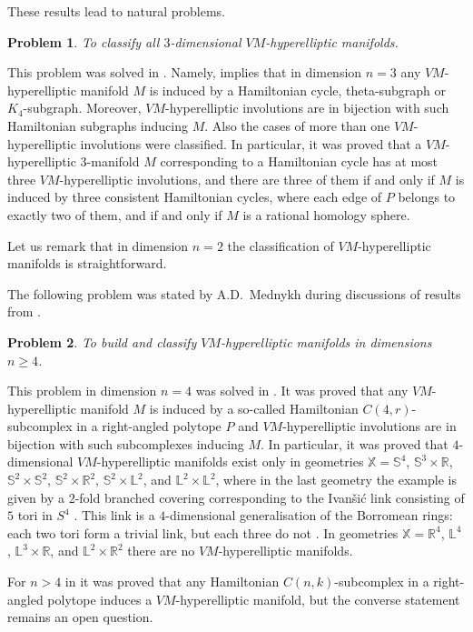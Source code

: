 \documentclass[12pt]{amsart}
\newtheorem{problem}{Problem}
\theoremstyle{definition}
\theoremstyle{remark}
\begin{document}
These results lead to natural problems.
\begin{problem}
To classify all $3$-dimensional $VM$-hyperelliptic manifolds.
\end{problem}
This problem was solved in \cite{E24}. Namely, \cite[Theorem 11.5]{E24} implies that in dimension $n=3$ any $VM$-hyperelliptic manifold $M$ is induced by a Hamiltonian cycle, theta-subgraph or $K_4$-subgraph. Moreover,
$VM$-hyperelliptic involutions are in bijection with such Hamiltonian subgraphs 
inducing $M$. Also the cases of more than one $VM$-hyperelliptic involutions were classified. In particular,
it was proved that a $VM$-hyperelliptic $3$-manifold $M$ corresponding to a Hamiltonian cycle has at most three 
$VM$-hyperelliptic involutions, and there are three of them if and only if $M$ is induced by three consistent Hamiltonian cycles,
where each edge of $P$ belongs to exactly two of them, and if and only if $M$ is a rational homology sphere.

Let us remark that in dimension $n=2$ the classification of $VM$-hyperelliptic manifolds is straightforward.

The following problem was stated by A.D.~Mednykh during discussions of results from \cite{E24}.
\begin{problem}
To build and classify $VM$-hyperelliptic manifolds in dimensions $n\geqslant 4$.
\end{problem}
This problem in dimension $n=4$ was solved in \cite{E26}. 
It was proved that any $VM$-hyperelliptic manifold $M$ is induced by a so-called Hamiltonian $C(4,r)$-subcomplex in 
a right-angled polytope $P$ and $VM$-hyperelliptic involutions are in bijection with such subcomplexes inducing $M$. In particular,
it was proved that $4$-dimensional $VM$-hyperelliptic manifolds exist only in geometries 
$\mathbb X=\mathbb S^4$, $\mathbb S^3\times \mathbb R$,  $\mathbb S^2\times \mathbb S^2$, 
$\mathbb S^2\times \mathbb R^2$, $\mathbb S^2\times\mathbb L^2$, and $\mathbb L^2\times\mathbb L^2$,
where in the last geometry the example is given by a $2$-fold branched covering corresponding to the 
Ivan\v{s}i\'{c} link consisting of $5$ tori in $S^4$ \cite{I04,I12}. This link  
is a $4$-dimensional generalisation of the Borromean rings: 
each two tori form a trivial link, but each three do not \cite[Theorem 1]{M24}. In geometries $\mathbb X=\mathbb R^4$,
$\mathbb L^4$, $\mathbb L^3\times \mathbb R$, and $\mathbb L^2\times\mathbb R^2$ there are no $VM$-hyperelliptic
manifolds.

For $n>4$ in \cite{E26} it was proved that any Hamiltonian $C(n,k)$-subcomplex in a right-angled polytope 
induces a $VM$-hyperelliptic manifold,
but the converse statement remains an open question.
\end{document}
